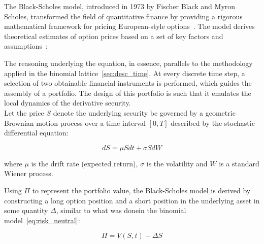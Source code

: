     The Black-Scholes model, introduced in 1973 by Fischer Black and Myron Scholes,
    transformed the field of quantitative finance by providing a rigorous mathematical framework for
    pricing European-style options~\cite{black_pricing_1973}.
    The model derives theoretical estimates of option prices based on a set of key factors and
    assumptions~\cite{wilmott_paul_2007}:

    The reasoning underlying the equation, in essence, parallels to the methodology applied in
    the binomial lattice~\ref{sec:desc_time}.
    At every discrete time step, a selection of two obtainable financial instruments is performed,
    which guides the assembly of a portfolio.
    The design of this portfolio is such that it emulates the local dynamics of the derivative security. \\

    Let the price $S$ denote the underlying security be governed by a geometric Brownian motion process
    over a time interval $[0, T]$ described by the stochastic differential equation:

    \begin{equation}
        dS = \mu S dt + \sigma S dW
        \label{eq:geometric_brownian}
    \end{equation}

    where $\mu$ is the drift rate (expected return), $\sigma$ is the volatility and $W$ is a
    standard Wiener process.

    Using $\Pi$ to represent the portfolio value, the Black-Scholes model is derived by constructing a
    long option position and a short position in the underlying asset in some quantity $\Delta$,
    similar to what was donein the binomial model~\ref{eq:risk_neutral}:

    \begin{equation}
        \Pi = V(S,t) - \Delta S
        \label{eq:portfolio_value}
    \end{equation}

